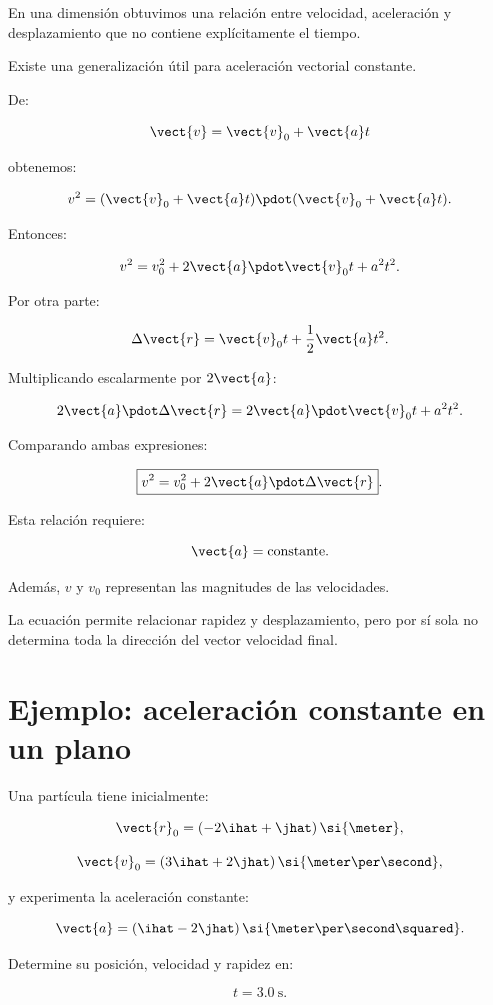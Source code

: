 En una dimensión obtuvimos una relación entre velocidad, aceleración y
desplazamiento que no contiene explícitamente el tiempo.

Existe una generalización útil para aceleración vectorial constante.

De:

\[
\vect{v}
=
\vect{v}_0+\vect{a}t
\]

obtenemos:

\[
v^2
=
(\vect{v}_0+\vect{a}t)
\pdot
(\vect{v}_0+\vect{a}t).
\]

Entonces:

\[
v^2
=
v_0^2
+
2\vect{a}\pdot\vect{v}_0t
+
a^2t^2.
\]

Por otra parte:

\[
\Delta\vect{r}
=
\vect{v}_0t
+
\frac{1}{2}\vect{a}t^2.
\]

Multiplicando escalarmente por \(2\vect{a}\):

\[
2\vect{a}\pdot\Delta\vect{r}
=
2\vect{a}\pdot\vect{v}_0t
+
a^2t^2.
\]

Comparando ambas expresiones:

\[
\boxed{
v^2
=
v_0^2
+
2\vect{a}\pdot\Delta\vect{r}
}.
\]

\begin{condicion}
Esta relación requiere:

\[
\vect{a}=\text{constante}.
\]

Además, \(v\) y \(v_0\) representan las magnitudes de las velocidades.

La ecuación permite relacionar rapidez y desplazamiento, pero por sí sola no
determina toda la dirección del vector velocidad final.
\end{condicion}


\section{Ejemplo: aceleración constante en un plano}

\begin{ejemplo}
Una partícula tiene inicialmente:

\[
\vect{r}_0
=
(-2\ihat+\jhat)\,\si{\meter},
\]

\[
\vect{v}_0
=
(3\ihat+2\jhat)\,
\si{\meter\per\second},
\]

y experimenta la aceleración constante:

\[
\vect{a}
=
(\ihat-2\jhat)\,
\si{\meter\per\second\squared}.
\]

Determine su posición, velocidad y rapidez en:

\[
t=\SI{3.0}{\second}.
\]
\end{ejemplo}

